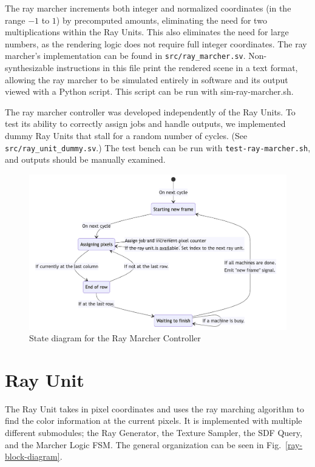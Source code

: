 \documentclass[conference]{IEEEtran}
\begin{document}
The ray marcher increments both integer and normalized coordinates (in the range $-1$ to $1$) by precomputed amounts, eliminating the need for two multiplications within the Ray Units. This also eliminates the need for large numbers, as the rendering logic does not require full integer coordinates. The ray marcher's implementation can be found in \texttt{src/ray\_marcher.sv}. Non-synthesizable instructions in this file print the rendered scene in a text format, allowing the ray marcher to be simulated entirely in software and its output viewed with a Python script. This script can be run with sim-ray-marcher.sh.

The ray marcher controller was developed independently of the Ray Units. To test its ability to correctly assign jobs and handle outputs, we implemented dummy Ray Units that stall for a random number of cycles. (See \texttt{src/ray\_unit\_dummy.sv}.) The test bench can be run with \texttt{test-ray-marcher.sh}, and outputs should be manually examined.

\begin{figure}[htbp]
\centerline{\includegraphics[scale=0.4]{ray-marcher-control.png}}
\caption{State diagram for the Ray Marcher Controller}
\label{ray-marcher-control}
\end{figure}



\section{Ray Unit}

The Ray Unit takes in pixel coordinates and uses the ray marching algorithm to find the color information at the current pixels. It is implemented with multiple different submodules; the Ray Generator, the Texture Sampler, the SDF Query, and the Marcher Logic FSM. The general organization can be seen in Fig.~\ref{ray-block-diagram}.
\end{document}
